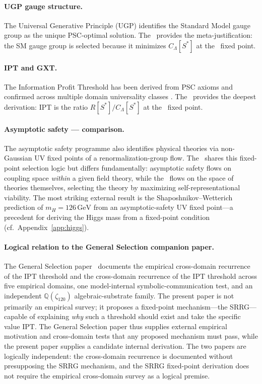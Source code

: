 \documentclass[11pt]{article}
\theoremstyle{remark}
\newcommand{\SRRG}{\text{SRRG}}
\newcommand{\IPT}{\mathrm{IPT}}
\newcommand{\Sstar}{S^*}
\begin{document}
\paragraph{UGP gauge structure.} The Universal Generative Principle (UGP) \cite{Spivack2025UGP}
identifies the Standard Model gauge group as the unique PSC-optimal solution. The
\SRRG\ provides the meta-justification: the SM gauge group is selected because it
minimizes $C_\Lambda[\Sstar]$ at the \SRRG\ fixed point.

\paragraph{IPT and GXT.} The Information Profit Threshold has been derived from PSC
axioms \cite{SpivackIPT} and confirmed across multiple domain universality classes
\cite{SpivackGeneralSelection}. The \SRRG\ provides the deepest derivation: IPT is
the ratio $R[\Sstar]/C_\Lambda[\Sstar]$ at the \SRRG\ fixed point.

\paragraph{Asymptotic safety --- comparison.}
The asymptotic safety programme
\cite{Reuter1998,Wetterich1993} also identifies physical theories via non-Gaussian
UV fixed points of a renormalization-group flow.
The \SRRG\ shares this fixed-point selection logic but differs fundamentally:
asymptotic safety flows on coupling space \emph{within} a given field theory, while
the \SRRG\ flows on the space of theories themselves, selecting the theory by
maximizing self-representational viability.
The most striking external result is the Shaposhnikov--Wetterich prediction
\cite{ShaposhnikovWetterich2010} of $m_H = 126\,\text{GeV}$ from an
asymptotic-safety UV fixed point---a precedent for deriving the Higgs mass from
a fixed-point condition (cf.\ Appendix~\ref{app:higgs}).

\paragraph{Logical relation to the General Selection companion paper.}
The General Selection paper~\cite{SpivackGeneralSelection} documents the
empirical cross-domain recurrence of the IPT threshold and the
cross-domain recurrence of the IPT threshold across five empirical domains, one model-internal symbolic-communication test, and an independent $\mathbb{Q}(\zeta_{120})$ algebraic-substrate family.
The present paper is not primarily an empirical survey; it proposes a
fixed-point mechanism---the SRRG---capable of explaining \emph{why} such
a threshold should exist and take the specific value $\IPT$.
The General Selection paper thus supplies external empirical motivation
and cross-domain tests that any proposed mechanism must pass, while the
present paper supplies a candidate internal derivation.
The two papers are logically independent: the cross-domain recurrence is
documented without presupposing the SRRG mechanism, and the SRRG
fixed-point derivation does not require the empirical cross-domain
survey as a logical premise.
\end{document}
